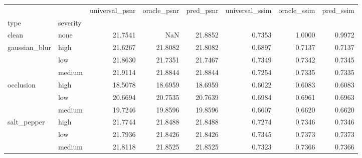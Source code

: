 \begin{tabular}{llrrrrrr}
\toprule
 &  & universal_psnr & oracle_psnr & pred_psnr & universal_ssim & oracle_ssim & pred_ssim \\
type & severity &  &  &  &  &  &  \\
\midrule
clean & none & 21.7541 & NaN & 21.8852 & 0.7353 & 1.0000 & 0.9972 \\
\cline{1-8}
\multirow[t]{3}{*}{gaussian_blur} & high & 21.6267 & 21.8082 & 21.8082 & 0.6897 & 0.7137 & 0.7137 \\
 & low & 21.8630 & 21.7351 & 21.7467 & 0.7349 & 0.7342 & 0.7345 \\
 & medium & 21.9114 & 21.8844 & 21.8844 & 0.7254 & 0.7335 & 0.7335 \\
\cline{1-8}
\multirow[t]{3}{*}{occlusion} & high & 18.5078 & 18.6959 & 18.6959 & 0.6022 & 0.6083 & 0.6083 \\
 & low & 20.6694 & 20.7535 & 20.7639 & 0.6984 & 0.6961 & 0.6963 \\
 & medium & 19.7246 & 19.8596 & 19.8596 & 0.6607 & 0.6620 & 0.6620 \\
\cline{1-8}
\multirow[t]{3}{*}{salt_pepper} & high & 21.7744 & 21.8488 & 21.8488 & 0.7274 & 0.7346 & 0.7346 \\
 & low & 21.7936 & 21.8426 & 21.8426 & 0.7345 & 0.7373 & 0.7373 \\
 & medium & 21.8118 & 21.8525 & 21.8525 & 0.7323 & 0.7366 & 0.7366 \\
\cline{1-8}
\bottomrule
\end{tabular}
